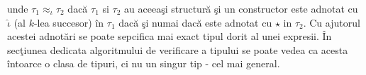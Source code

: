 unde $\tau_1 \approx_{\iota} \tau_2$ dac\u a $\tau_1$ si $\tau_2$ au aceea\c si structur\u a \c si un constructor este adnotat cu $\widehat{ \iota }$ (al $k$-lea succesor) \^ in $\tau_1$ dac\u a \c si numai dac\u a este adnotat cu $\star$ in $\tau_2$. Cu ajutorul acestei adnot\u ari se poate sepcifica mai exact tipul dorit al unei expresii. \^ In sec\c tiunea dedicata algoritmului de verificare a tipului se poate vedea ca acesta \^ intoarce o clasa de tipuri, ci nu un singur tip - cel mai general.

